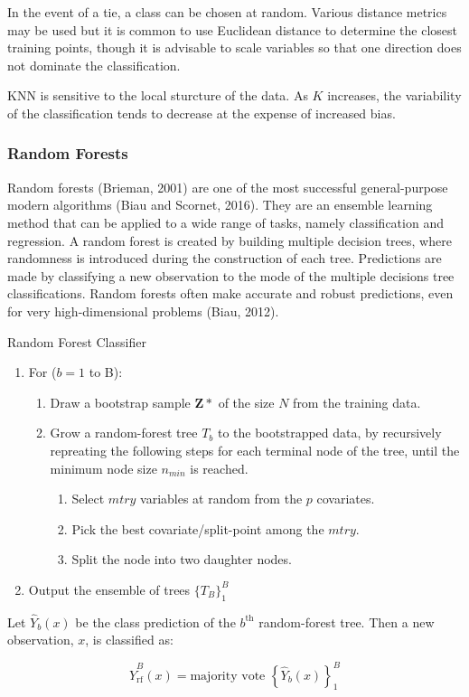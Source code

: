 \documentclass[12pt,]{article}
\begin{document}
In the event of a tie, a class can be chosen at random. Various distance
metrics may be used but it is common to use Euclidean distance to
determine the closest training points, though it is advisable to scale
variables so that one direction does not dominate the classification.

KNN is sensitive to the local sturcture of the data. As \(K\) increases,
the variability of the classification tends to decrease at the expense
of increased bias.

\subsubsection{Random Forests}\label{random-forests}

Random forests (Brieman, 2001) are one of the most successful
general-purpose modern algorithms (Biau and Scornet, 2016). They are an
ensemble learning method that can be applied to a wide range of tasks,
namely classification and regression. A random forest is created by
building multiple decision trees, where randomness is introduced during
the construction of each tree. Predictions are made by classifying a new
observation to the mode of the multiple decisions tree classifications.
Random forests often make accurate and robust predictions, even for very
high-dimensional problems (Biau, 2012).

\begin{algorithm}[H]
\caption{Random Forest Classifier}
\DontPrintSemicolon
\SetAlgoLined
\BlankLine

\begin{enumerate}
  \item For ($b=1$ to B):
    \begin{enumerate}
      \item Draw a bootstrap sample $\mathbf{Z*}$ of the size $N$ from the training data.
      \item Grow a random-forest tree $T_b$ to the bootstrapped data, by recursively repreating the following steps for each terminal node of the tree, until the minimum node size $n_{min}$ is reached.
      \begin{enumerate}
        \item Select $mtry$ variables at random from the $p$ covariates. 
        \item Pick the best covariate/split-point among the $mtry$. 
        \item Split the node into two daughter nodes. 
      \end{enumerate}
    \end{enumerate}
  \item Output the ensemble of trees $\{T_B\}^B_1$
\end{enumerate}
\BlankLine

Let $\hat{Y}_b(x)$ be the class prediction of the $b^{\text{th}}$ random-forest tree.  Then a new observation, $x$, is classified as:

$$\hat{Y}^B_{\text{rf}}(x) = \text{majority vote } \left\{ \hat{Y}_b(x) \right\}^B_1$$
\end{algorithm}
\end{document}
